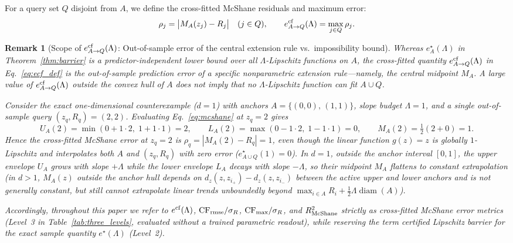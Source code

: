 \documentclass[preprint,11pt,a4paper]{elsarticle}
\newtheorem{remark}{Remark}
\newcommand{\ecf}{e^{\rm cf}}
\begin{document}
For a query set $Q$ disjoint from $A$, we define the cross-fitted McShane residuals and maximum error:
\begin{equation}
\rho_j = \big|M_A(z_j)-R_j\big|\quad (j\in Q),
\qquad
\ecf_{A\to Q}(\Lambda)=\max_{j\in Q}\rho_j.
\label{eq:ecf_def}
\end{equation}

\begin{remark}[Scope of $\ecf_{A\to Q}(\Lambda)$: Out-of-sample error of the central extension rule vs.\ impossibility bound]
\label{rem:mcshane_scope}
Whereas $e^\star_A(\Lambda)$ in Theorem~\ref{thm:barrier} is a predictor-independent lower bound over \emph{all} $\Lambda$-Lipschitz functions on $A$, the cross-fitted quantity $\ecf_{A\to Q}(\Lambda)$ in Eq.~\eqref{eq:ecf_def} is the out-of-sample prediction error of a \emph{specific} nonparametric extension rule---namely, the central midpoint $M_A$. A large value of $\ecf_{A\to Q}(\Lambda)$ outside the convex hull of $A$ does not imply that no $\Lambda$-Lipschitz function can fit $A\cup Q$.

Consider the exact one-dimensional counterexample ($d=1$) with anchors $A=\{(0,0),\,(1,1)\}$, slope budget $\Lambda=1$, and a single out-of-sample query $(z_q,R_q)=(2,2)$. Evaluating Eq.~\eqref{eq:mcshane} at $z_q=2$ gives
\[
U_A(2)=\min(0+1\cdot 2,\;1+1\cdot 1)=2,\qquad
L_A(2)=\max(0-1\cdot 2,\;1-1\cdot 1)=0,\qquad
M_A(2)=\tfrac12(2+0)=1.
\]
Hence the cross-fitted McShane error at $z_q=2$ is $\rho_q=|M_A(2)-R_q|=1$, even though the linear function $g(z)=z$ is globally $1$-Lipschitz and interpolates both $A$ and $(z_q,R_q)$ with zero error ($e^\star_{A\cup Q}(1)=0$). In $d=1$, outside the anchor interval $[0,1]$, the upper envelope $U_A$ grows with slope $+\Lambda$ while the lower envelope $L_A$ decays with slope $-\Lambda$, so their midpoint $M_A$ flattens to constant extrapolation (in $d>1$, $M_A(z)$ outside the anchor hull depends on $d_z(z,z_{i_+})-d_z(z,z_{i_-})$ between the active upper and lower anchors and is not generally constant, but still cannot extrapolate linear trends unboundedly beyond $\max_{i\in A}R_i+\frac12\Lambda\operatorname{diam}(A)$).

Accordingly, throughout this paper we refer to $\ecf(\Lambda)$, ${\rm CF}_{\rm rmse}/\sigma_R$, ${\rm CF}_{\max}/\sigma_R$, and $R^2_{\rm McShane}$ strictly as \emph{cross-fitted McShane error metrics} (Level~3 in Table~\ref{tab:three_levels}, evaluated without a trained parametric readout), while reserving the term \emph{certified Lipschitz barrier} for the exact sample quantity $e^\star(\Lambda)$ (Level~2).
\end{remark}
\end{document}
